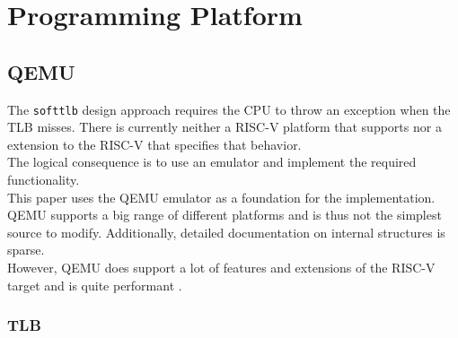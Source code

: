 


\section{Programming Platform}
\subsection{QEMU}
The \texttt{softtlb} design approach requires the CPU to throw an exception when the TLB misses. There is
currently neither a RISC-V platform that supports nor a extension to the RISC-V that specifies that behavior.\\
The logical consequence is to use an emulator and implement the required functionality.\\
This paper uses the QEMU emulator as a foundation for the implementation. QEMU supports a big range of
different platforms and is thus not the simplest source to modify. Additionally, detailed documentation
on internal structures is sparse.\\
However, QEMU does support a lot of features and extensions of the RISC-V target and is quite performant
\cite{bellard2005QEMU}.


\subsubsection{TLB}



